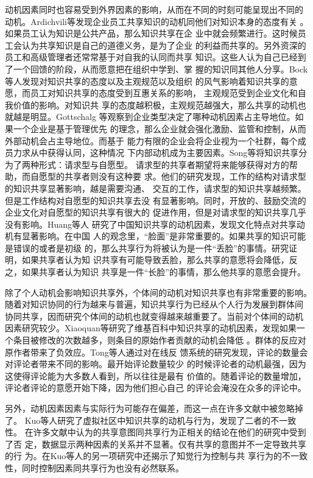 \documentclass[12pt,a4paper,cs4size]{ctexart}
\begin{document}
动机因素同时也容易受到外界因素的影响，从而在不同的时刻可能呈现出不同的
动机。Ardichvili等发现企业员工共享知识的动机同他们对知识本身的态度有关
\cite{ardichvili2003mab}。如果员工认为知识是公共产品，那么知识共享在企
业中就会频繁进行。这时候员工会认为共享知识是自己的道德义务，是为了企业
的利益而共享的。另外资深的员工和高级管理者还常常基于对自我的认同而共享
知识。这些人认为自己已经到了一个回馈的阶段，从而愿意把在组织中学到、掌
握的知识同其他人分享。Bock等人发现对知识共享的态度以及主观规范以及组织
的风气影响着知识共享的意愿，而员工对知识共享的态度受到互惠关系的影响，
主观规范受到企业文化和自我价值的影响\cite{1631336620050301}。对知识共
享的态度越积极，主观规范越强大，那么共享的动机也就越是明显。Gottschalg
等观察到企业类型决定了哪种动机因素占主导地位\cite{Gottschalg2006}。如果一个企业是基于管理优先
的理念，那么企业就会强化激励、监管和控制，从而外部动机会占主导地位。而基于
能力有限的企业会将企业视为一个社群，每个成员力求从中获得认同，这种情况
下内部动机成为主要因素。Song等将知识共享分为了两种形式：请求型与自愿型。
请求型的共享者期望将来能够获得对方的帮助，而自愿型的共享者则没有这种要
求。他们的研究发现，工作的结构对请求型的知识共享显著影响，越是需要沟通、
交互的工作，请求型的知识共享越频繁。但是工作结构对自愿型的知识共享去没
有显著影响。同时，开放的、鼓励交流的企业文化对自愿型的知识共享有很大的
促进作用，但是对请求型的知识共享几乎没有影响\cite{4439047}。Huang等人
研究了中国知识共享的动机因素，发现文化特点对共享动机有显著影响。在中国
人的观念里，“脸面”是非常重要的。如果共享的知识可能是错误的或者是初级
的，那么共享行为将被认为是一件“丢脸”的事情。研究证明，如果共享者认为知
识共享有可能导致丢脸，那么共享的意愿将会降低，反之，如果共享者认为知识
共享是一件“长脸”的事情，那么他共享的意愿会提升\cite{huang2008ipa}。

除了个人动机会影响知识共享外，个体间的动机对知识共享也有非常重要的影响。
随着对知识协同的行为越来与普遍，知识共享行为已经从个人行为发展到群体间
协同共享，因而研究个体间的动机也就变得越来越重要了。当前对个体间的动机
因素研究较少。Xiaoquan等研究了维基百科中知识共享的动机因素，发现如果一
个条目被修改的次数越多，则条目的原始作者贡献的动机会降低
\cite{Zhang2006}。群体的反应对原作者带来了负效应。Tong等人通过对在线反
馈系统的研究发现，评论的数量会对评论者带来不同的影响。最开始评论数量较少
的时候评论者的动机最强，因为这使得评论能为大多数人看到，所以往往是最有
价值的。随着评论的数量增加，评论者评论的意愿开始下降，因为他们担心自己
的评论会淹没在众多的评论中\cite{tong2007uii}。

另外，动机因素因素与实际行为可能存在偏差，而这一点在许多文献中被忽略掉
了。 Kuo等人研究了虚拟社区中知识共享的动机与行为，发现了二者的不一致性。
在许多文献中认为的共享意图同共享行为正相关的结论在他们的研究中受到了否
定，数据显示两种因素的关系并不显著。仅有共享的意图并不一定导致共享的行
为\cite{Kuowiley2008}。在Kuo等人的另一项研究中还揭示了知觉行为控制与共
享行为的不一致性，同时控制因素同共享行为也没有必然联系\cite{Kuo2008}。
\end{document}
